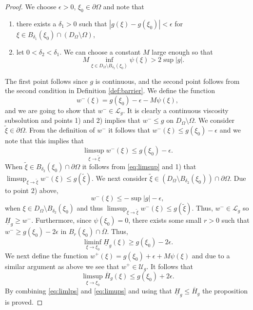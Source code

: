 \documentclass[11pt]{article}
\providecommand{\Rnp}{D_{\Omega}}
\providecommand{\RnpO}{D_{\Omega}\setminus \Omega}
\providecommand{\ug}{\mathcal{U}_g}
\providecommand{\ups}{\overline{H}_g}
\providecommand{\lps}{\underline{H}_g}
\providecommand{\lcg}{\mathcal{L}_g}
\numberwithin{equation}{section}
\theoremstyle{definition}
\begin{document}
\begin{proof} 
 We choose $\epsilon >0$, $\xi_0 \in  \partial \Omega $ and note that  
  \begin{enumerate}
      \item  there exists a $\delta_1 >0$ such that $|g(\xi)-g(\xi_0)| < \epsilon$ for $\xi \in B_{\delta_1}(\xi_0) \cap (\RnpO)$,
      \item let $0<\delta_2 < \delta_1$. We can choose a constant $M$ large enough so that 
      $$
      M \inf_{\xi \in \Rnp \setminus B_{\delta_2}(\xi_0)}\psi(\xi) > 2 \sup |g|.
      $$
  \end{enumerate}
  The first point follows since $g$ is continuous, and the second point follows from the second condition in Definition \ref{def:barrier}. We define the function 
  \begin{equation*}
      w^-(\xi)= g(\xi_0)-\epsilon-M \psi(\xi), 
  \end{equation*}
  and we are going to show that $w^-\in \lcg$. It is clearly a continuous viscosity subsolution and points 1) and 2) implies that $w^- \leq g$ on $\RnpO$.  We consider $\tilde{\xi}\in \partial \Omega$. From the definition of $w^-$ it follows that $w^-(\xi) \leq g(\xi_0)-\epsilon$ and we note that this implies that
\begin{equation}\label{eq:limsup}
    \limsup_{\xi \to \tilde{\xi}} w^-(\xi) \leq g(\xi_0)-\epsilon.
\end{equation}
When $\tilde{\xi} \in B_{\delta_2}(\xi_0) \cap \partial \Omega$ it follows from \eqref{eq:limsup} and 1) that $ \limsup_{\xi \to \tilde{\xi}} w^-(\xi) \leq g(\tilde{\xi})$.  We next consider $\tilde{\xi } \in (\Rnp \setminus B_{\delta_2}(\xi_0)) \cap \partial \Omega$. Due to point 2) above,
  \begin{equation}\label{eq:wsup}
      w^-(\xi) \leq -\sup |g|-\epsilon,
  \end{equation}
when $\xi \in \Rnp \setminus B_{\delta_2}(\xi_0)$ and thus $ \limsup_{\xi \to \tilde{\xi}} w^-(\xi) \leq g(\tilde{\xi})$. Thus, $w^- \in \lcg$ so $\lps \geq w^-$. Furthermore, since $ \psi(\xi_0) = 0$, there exists some small $r>0$ such that $w^- \geq g(\xi_0)-2 \epsilon$ in $B_r(\xi_0) \cap \overline{\Omega}$. Thus, 
    \begin{equation}\label{eq:limlps}
       \liminf_{\xi \to \xi_0} \lps(\xi) \geq  g(\xi_0)-2\epsilon. 
    \end{equation}
We next define the function $w^+(\xi)= g(\xi_0)+\epsilon+M \psi(\xi)$
    and due to a similar argument as above we see that $w^+ \in \ug$. It follows that
    \begin{equation}\label{eq:limups}
        \limsup_{\xi \to \xi_0} \ups(\xi) \leq g(\xi_0)+2\epsilon.
    \end{equation}
    By combining \eqref{eq:limlps} and \eqref{eq:limups} and using that $\lps \leq \ups$ the proposition is proved.
\end{proof}
\end{document}
